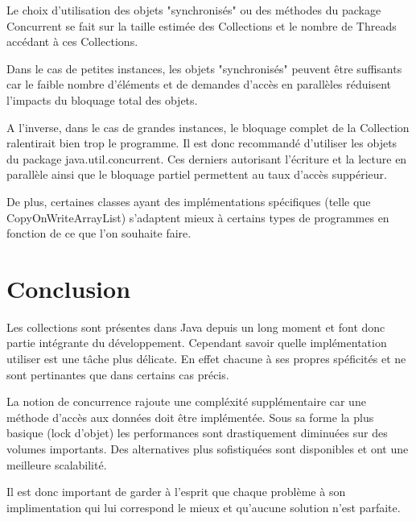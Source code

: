 \documentclass{report}
\begin{document}
		Le choix d'utilisation des objets "synchronisés" ou des méthodes du package Concurrent se fait sur la taille estimée des Collections et le nombre de Threads accédant à ces Collections.
		
		Dans le cas de petites instances, les objets "synchronisés" peuvent être suffisants car le faible nombre d'éléments et de demandes d'accès en parallèles réduisent l'impacts du bloquage total des objets.
		
		A l'inverse, dans le cas de grandes instances, le bloquage complet de la Collection ralentirait bien trop le programme. Il est donc recommandé d'utiliser les objets du package java.util.concurrent.
		Ces derniers autorisant l'écriture et la lecture en parallèle ainsi que le bloquage partiel permettent au taux d'accès suppérieur.

		De plus, certaines classes ayant des implémentations spécifiques (telle que CopyOnWriteArrayList) s'adaptent mieux à certains types de programmes en fonction de ce que l'on souhaite faire.

	\chapter{Conclusion}
		Les collections sont présentes dans Java depuis un long moment et font donc partie intégrante du développement.
		Cependant savoir quelle implémentation utiliser est une tâche plus délicate.
		En effet chacune à ses propres spéficités et ne sont pertinantes que dans certains cas précis.

		La notion de concurrence rajoute une compléxité supplémentaire car une méthode d'accès aux données doit être implémentée.
		Sous sa forme la plus basique (lock d'objet) les performances sont drastiquement diminuées sur des volumes importants.
		Des alternatives plus sofistiquées sont disponibles et ont une meilleure scalabilité.

		Il est donc important de garder à l'esprit que chaque problème à son implimentation qui lui correspond le mieux et qu'aucune solution n'est parfaite.
\end{document}
